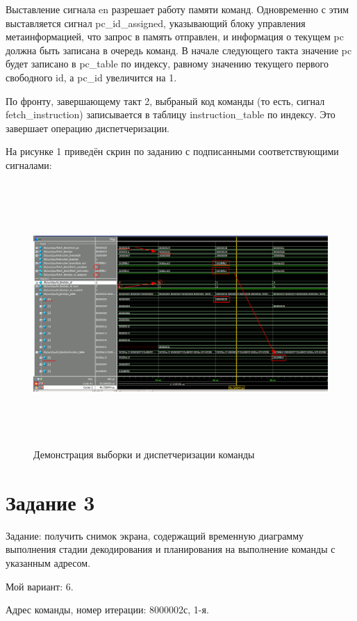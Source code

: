 Выставление сигнала en разрешает работу памяти команд. Одновременно с этим выставляется сигнал pc\_id\_assigned, указывающий блоку управления метаинформацией,
что запрос в память отправлен, и информация о текущем pc должна быть записана в очередь команд.
В начале следующего такта значение pc будет записано в pc\_table по индексу, равному значению текущего первого свободного id, а
pc\_id увеличится на 1.


По фронту, завершающему такт 2, выбраный код команды (то есть, сигнал fetch\_instruction) записывается
в таблицу instruction\_table по индексу. Это завершает операцию диспетчеризации.

На рисунке 1 приведён скрин по заданию с подписанными соответствующими сигналами:
\FloatBarrier
\begin{figure}[h]
	\begin{center}
		\includegraphics[width=\linewidth, height=10cm]{inc/first_ex.png}
	\end{center}
	\caption{Демонстрация выборки и диспетчеризации команды}
\end{figure}
\FloatBarrier


\section*{Задание 3}
Задание: получить снимок экрана, содержащий временную диаграмму выполнения стадии декодирования и планирования на выполнение команды с указанным адресом. 

Мой вариант: 6.

Адрес команды, номер итерации: 8000002с, 1-я. 

